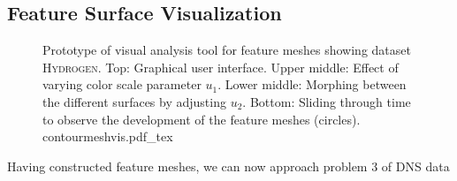 \subsection{Feature Surface Visualization}
%
\begin{figure}[p]
    \begin{captionbeside}
    {Prototype of visual analysis tool for feature meshes showing dataset
	\textsc{Hydrogen}. Top: Graphical user interface. Upper middle: Effect of
	varying color scale parameter $u_1$. Lower middle: Morphing between the
	different surfaces  by adjusting $u_2$. Bottom: Sliding through time to
	observe the development of the feature meshes (circles).
	 }
 	\def\svgwidth{0.6\linewidth}
		{contourmeshvis.pdf_tex}
    \end{captionbeside}
	\label{fig_contourmeshvis}
\end{figure}
%
Having constructed feature meshes, we can now approach problem 3 of DNS data
